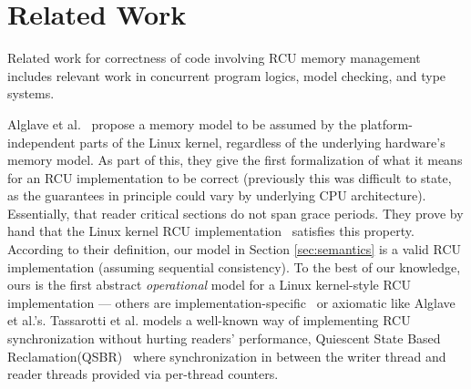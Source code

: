 \section{Related Work}
\label{sec:relatedwork}
Related work for correctness of code involving RCU memory management includes relevant work in concurrent program logics, model checking, and type systems.

Alglave et al.~\cite{Alglave:2018:FSC:3173162.3177156} propose a memory model to be assumed by the platform-independent parts of the Linux kernel, regardless of the underlying hardware's memory model.
As part of this, they give the first formalization of what it means for an RCU implementation to be correct (previously this was difficult to state, as the guarantees in principle could vary by underlying CPU architecture). Essentially, that reader critical sections do not span grace periods.  They prove by hand that the Linux kernel RCU implementation~\cite{DBLP:conf/cav/AlglaveKT13,abssem} satisfies this property. 
According to their definition, our model in Section \ref{sec:semantics} is a valid RCU implementation (assuming sequential consistency).
To the best of our knowledge, ours is the first abstract \emph{operational} model for a Linux kernel-style RCU implementation --- others are implementation-specific~\cite{Mandrykin:2016:TDV:3001219.3001297} or axiomatic like Alglave et al.'s. Tassarotti et al. models a well-known way of implementing RCU synchronization without hurting readers' performance, \textsf{Quiescent State Based Reclamation}(QSBR)~\cite{urcu_ieee} where synchronization in between the writer thread and reader threads provided via per-thread counters. 

